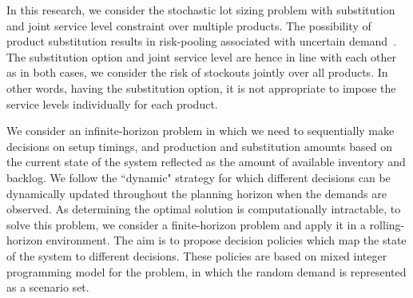\documentclass[11pt]{article}
\begin{document}
In this research, we consider the stochastic lot sizing problem with substitution and joint service level constraint over multiple products. The possibility of product substitution results in risk-pooling associated with uncertain demand~\cite{shin2015classification}. The substitution option and joint service level are hence in line with each other as in both cases, we consider the risk of stockouts jointly over all products.
In other words, having the substitution option, it is not appropriate to impose the service levels individually for each product.



We consider an infinite-horizon problem in which we need to sequentially make decisions on setup timings, and production and substitution amounts based on the current state of the system reflected as the amount of available inventory and backlog. We follow the ``dynamic" strategy \cite{bookbinder1988strategies} for which different decisions can be dynamically updated throughout the planning horizon when the demands are observed. As determining the optimal solution is computationally intractable, to solve this problem, we consider a finite-horizon problem and apply it in a rolling-horizon environment. The aim is to propose decision policies which map the state of the system to different decisions. These policies are based on mixed integer programming model for the problem, in which the random demand is represented as a scenario set.
\end{document}
